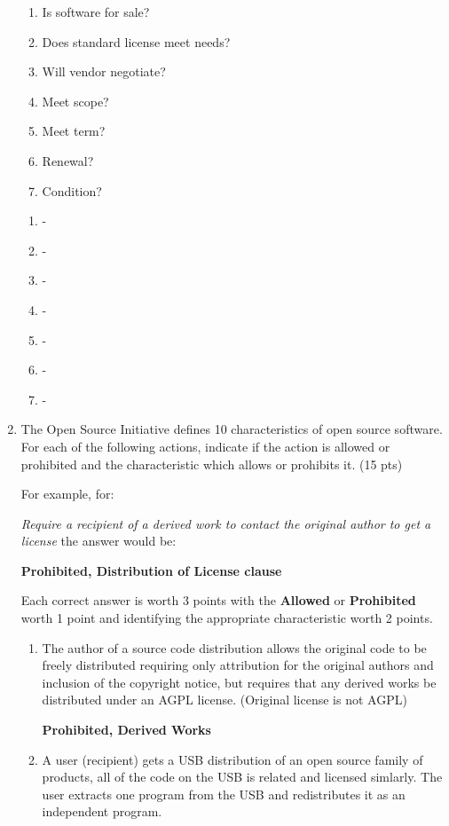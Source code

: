 \documentclass[10pt]{article}
\begin{document}
\begin{enumerate}
\beginanswers
\begin{enumerate}[1]
	\item Is software for sale?
	\item Does standard license meet needs?
	\item Will vendor negotiate?
	\item Meet scope?
	\item Meet term?
	\item Renewal?
	\item Condition?
\end{enumerate}
\newpage
\else
\begin{enumerate}[1]
	\item -
	\bigskip
	\bigskip
	\bigskip
	\item -
	\bigskip
	\bigskip
	\bigskip
	\item -
	\bigskip
	\bigskip
	\bigskip
	\item -
	\bigskip
	\bigskip
	\bigskip
	\item -
	\bigskip
	\bigskip
	\bigskip
	\item -
	\bigskip
	\bigskip
	\bigskip
	\item -
	\bigskip
	\bigskip
	\bigskip
\end{enumerate}
\fi

	\item The Open Source Initiative defines 10 characteristics of open source software. For each of the following actions, indicate if the action is allowed or prohibited and the characteristic which allows or prohibits it. (15 pts)
	
	For example, for:
	
	\textit{Require a recipient of a derived work to contact the original author to get a license} the answer would be:
	
	\textbf{Prohibited, Distribution of License clause}
	
Each correct answer is worth 3 points with the \textbf{Allowed} or \textbf{Prohibited} worth 1 point and identifying the appropriate characteristic worth 2 points.

\beginanswers
\begin{enumerate}
		\item The author of a source code distribution allows the original code to be freely distributed requiring only attribution for the original authors and inclusion of the copyright notice, but requires that any derived works be distributed under an AGPL  license. (Original license is not AGPL)
	
	\textbf{Prohibited, Derived Works}
	\bigskip
		\item A user (recipient) gets a USB distribution of an open source family of products, all of the code on the USB is related and licensed simlarly. The user extracts one program from the USB and redistributes it as an independent program.
		

\end{enumerate}
\end{enumerate}
\end{document}
